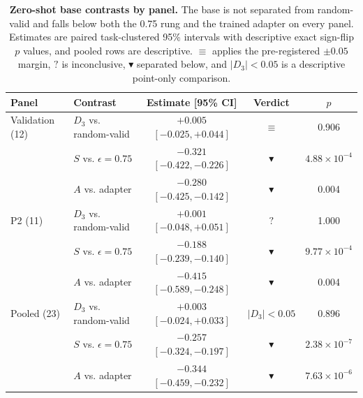 \begin{table}[t]
\caption{\textbf{Zero-shot base contrasts by panel.} The base is not separated from random-valid and falls below both the 0.75 rung and the trained adapter on every panel. Estimates are paired task-clustered 95\% intervals with descriptive exact sign-flip $p$ values, and pooled rows are descriptive. $\equiv$ applies the pre-registered $\pm0.05$ margin, $?$ is inconclusive, $\blacktriangledown$ separated below, and $|D_3|<0.05$ is a descriptive point-only comparison.}
\label{tab:appendix-zeroshot}
\centering\footnotesize
\setlength{\tabcolsep}{3pt}
\begin{tabular}{@{}llccc@{}}
\toprule[0.4mm]
\rowcolor{mygray}\textbf{Panel} & \textbf{Contrast} & \textbf{Estimate [95\% CI]} & \textbf{Verdict} & \textbf{$p$} \\
\midrule
Validation (12) & $D_3$ vs. random-valid & $+0.005$ $[-0.025, +0.044]$ & $\equiv$ & 0.906 \\
 & $S$ vs. $\epsilon{=}0.75$ & $-0.321$ $[-0.422, -0.226]$ & $\blacktriangledown$ & $4.88\times10^{-4}$ \\
 & $A$ vs. adapter & $-0.280$ $[-0.425, -0.142]$ & $\blacktriangledown$ & 0.004 \\
\midrule
P2 (11) & $D_3$ vs. random-valid & $+0.001$ $[-0.048, +0.051]$ & $?$ & 1.000 \\
 & $S$ vs. $\epsilon{=}0.75$ & $-0.188$ $[-0.239, -0.140]$ & $\blacktriangledown$ & $9.77\times10^{-4}$ \\
 & $A$ vs. adapter & $-0.415$ $[-0.589, -0.248]$ & $\blacktriangledown$ & 0.004 \\
\midrule
\rowcolor{yellow!25}Pooled (23) & $D_3$ vs. random-valid & $+0.003$ $[-0.024, +0.033]$ & $|D_3|<0.05$ & 0.896 \\
\rowcolor{yellow!25} & $S$ vs. $\epsilon{=}0.75$ & $-0.257$ $[-0.324, -0.197]$ & $\blacktriangledown$ & $2.38\times10^{-7}$ \\
\rowcolor{yellow!25} & $A$ vs. adapter & $-0.344$ $[-0.459, -0.232]$ & $\blacktriangledown$ & $7.63\times10^{-6}$ \\
\bottomrule
\end{tabular}
\end{table}

